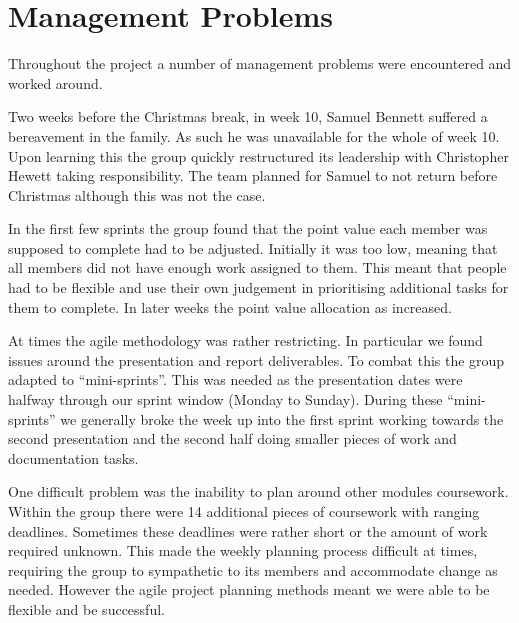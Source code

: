 \section{Management Problems}

Throughout the project a number of management problems were encountered and worked around.

Two weeks before the Christmas break, in week 10, Samuel Bennett suffered a bereavement in the family. As such he was unavailable for the whole of week 10. Upon learning this the group quickly restructured its leadership with Christopher Hewett taking responsibility. The team planned for Samuel to not return before Christmas although this was not the case.

In the first few sprints the group found that the point value each member was supposed to complete had to be adjusted. Initially it was too low, meaning that all members did not have enough work assigned to them. This meant that people had to be flexible and use their own judgement in prioritising additional tasks for them to complete. In later weeks the point value allocation as increased.

At times the agile methodology was rather restricting. In particular we found issues around the presentation and report deliverables. To combat this the group adapted to ``mini-sprints''. This was needed as the presentation dates were halfway through our sprint window (Monday to Sunday). During these ``mini-sprints'' we generally broke the week up into the first sprint working towards the second presentation and the second half doing smaller pieces of work and documentation tasks.

One difficult problem was the inability to plan around other modules coursework. Within the group there were 14 additional pieces of coursework with ranging deadlines. Sometimes these deadlines were rather short or the amount of work required unknown. This made the weekly planning process difficult at times, requiring the group to sympathetic to its members and accommodate change as needed. However the agile project planning methods meant we were able to be flexible and be successful.
